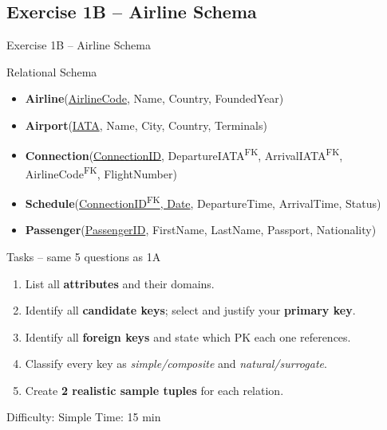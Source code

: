\documentclass[10pt]{beamer}
\begin{document}
\subsection{Exercise 1B -- Airline Schema}

\begin{frame}{Exercise 1B -- Airline Schema}
  \begin{block}{Relational Schema}
    \small
    \begin{itemize}
      \item \textbf{Airline}(\underline{AirlineCode}, Name, Country, FoundedYear)
      \item \textbf{Airport}(\underline{IATA}, Name, City, Country, Terminals)
      \item \textbf{Connection}(\underline{ConnectionID}, DepartureIATA\textsuperscript{FK}, ArrivalIATA\textsuperscript{FK}, AirlineCode\textsuperscript{FK}, FlightNumber)
      \item \textbf{Schedule}(\underline{ConnectionID\textsuperscript{FK}, Date}, DepartureTime, ArrivalTime, Status)
      \item \textbf{Passenger}(\underline{PassengerID}, FirstName, LastName, Passport, Nationality)
    \end{itemize}
  \end{block}

  \begin{block}{Tasks -- same 5 questions as 1A}
    \begin{enumerate}
      \item List all \textbf{attributes} and their domains.
      \item Identify all \textbf{candidate keys}; select and justify your \textbf{primary key}.
      \item Identify all \textbf{foreign keys} and state which PK each one references.
      \item Classify every key as \emph{simple/composite} and \emph{natural/surrogate}.
      \item Create \textbf{2 realistic sample tuples} for each relation.
    \end{enumerate}
  \end{block}

  \begin{alertblock}{Difficulty: Simple \quad Time: 15 min}
  \end{alertblock}
\end{frame}
\end{document}
